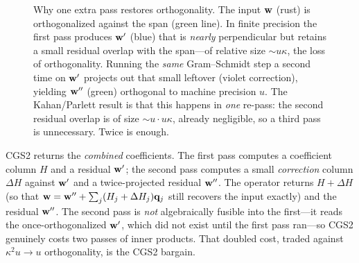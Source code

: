\begin{figure}[t]
\centering
{}
\caption[``Twice is enough'' re-orthogonalization]{Why one extra pass restores
orthogonality. The input $\mathbf{w}$ (rust) is orthogonalized against the span (green
line). In finite precision the first pass produces $\mathbf{w}'$ (blue) that is \emph{nearly}
perpendicular but retains a small residual overlap with the span---of relative size
$\sim u\kappa$, the loss of orthogonality. Running the \emph{same} Gram--Schmidt step
a second time on $\mathbf{w}'$ projects out that small leftover (violet correction),
yielding $\mathbf{w}''$ (green) orthogonal to machine precision $u$. The Kahan/Parlett
result is that this happens in \emph{one} re-pass: the second residual overlap is of
size $\sim u\cdot u\kappa$, already negligible, so a third pass is unnecessary. Twice
is enough.}
\label{fig:twice}
\end{figure}

\begin{notationbox}
CGS2 returns the \emph{combined} coefficients. The first pass computes a coefficient
column $H$ and a residual $\mathbf{w}'$; the second pass computes a small \emph{correction}
column $\Delta H$ against $\mathbf{w}'$ and a twice-projected residual $\mathbf{w}''$. The operator
returns $H + \Delta H$ (so that $\mathbf{w} = \mathbf{w}'' + \sum_j (H_j + \Delta H_j)\mathbf{q}_j$ still
recovers the input exactly) and the residual $\mathbf{w}''$. The second pass is \emph{not}
algebraically fusible into the first---it reads the once-orthogonalized $\mathbf{w}'$, which
did not exist until the first pass ran---so CGS2 genuinely costs two passes of inner
products. That doubled cost, traded against $\kappa^2 u \to u$ orthogonality, is the
CGS2 bargain.
\end{notationbox}


